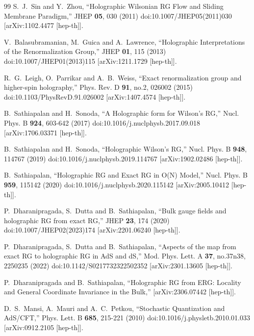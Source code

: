 \documentclass[12pt,epsbox]{article}
\numberwithin{equation}{section}
\begin{document}
\begin{thebibliography}{99}
S.~J.~Sin and Y.~Zhou,
``Holographic Wilsonian RG Flow and Sliding Membrane Paradigm,''
JHEP \textbf{05}, 030 (2011)
doi:10.1007/JHEP05(2011)030
[arXiv:1102.4477 [hep-th]].

V.~Balasubramanian, M.~Guica and A.~Lawrence,
``Holographic Interpretations of the Renormalization Group,''
JHEP \textbf{01}, 115 (2013)
doi:10.1007/JHEP01(2013)115
[arXiv:1211.1729 [hep-th]].

R.~G.~Leigh, O.~Parrikar and A.~B.~Weiss,
``Exact renormalization group and higher-spin holography,''
Phys. Rev. D \textbf{91}, no.2, 026002 (2015)
doi:10.1103/PhysRevD.91.026002
[arXiv:1407.4574 [hep-th]].

B.~Sathiapalan and H.~Sonoda,
``A Holographic form for Wilson's RG,''
Nucl. Phys. B \textbf{924}, 603-642 (2017)
doi:10.1016/j.nuclphysb.2017.09.018
[arXiv:1706.03371 [hep-th]].

B.~Sathiapalan and H.~Sonoda,
``Holographic Wilson's RG,''
Nucl. Phys. B \textbf{948}, 114767 (2019)
doi:10.1016/j.nuclphysb.2019.114767
[arXiv:1902.02486 [hep-th]].

B.~Sathiapalan,
``Holographic RG and Exact RG in O(N) Model,''
Nucl. Phys. B \textbf{959}, 115142 (2020)
doi:10.1016/j.nuclphysb.2020.115142
[arXiv:2005.10412 [hep-th]].

P.~Dharanipragada, S.~Dutta and B.~Sathiapalan,
``Bulk gauge fields and holographic RG from exact RG,''
JHEP \textbf{23}, 174 (2020)
doi:10.1007/JHEP02(2023)174
[arXiv:2201.06240 [hep-th]].

P.~Dharanipragada, S.~Dutta and B.~Sathiapalan,
``Aspects of the map from exact RG to holographic RG in AdS and dS,''
Mod. Phys. Lett. A \textbf{37}, no.37n38, 2250235 (2022)
doi:10.1142/S0217732322502352
[arXiv:2301.13605 [hep-th]].

P.~Dharanipragada and B.~Sathiapalan,
``Holographic RG from ERG: Locality and General Coordinate Invariance in the Bulk,''
[arXiv:2306.07442 [hep-th]].

D.~S.~Mansi, A.~Mauri and A.~C.~Petkou,
``Stochastic Quantization and AdS/CFT,''
Phys. Lett. B \textbf{685}, 215-221 (2010)
doi:10.1016/j.physletb.2010.01.033
[arXiv:0912.2105 [hep-th]].


\end{thebibliography}
\end{document}
